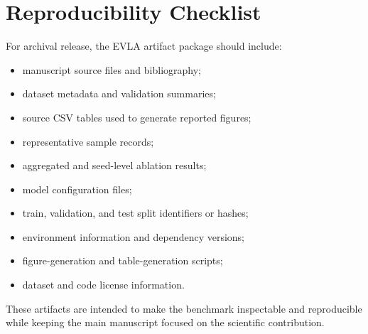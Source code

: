 \documentclass[preprint,12pt]{elsarticle}
\begin{document}
\section{Reproducibility Checklist}
\label{supp:checklist}

For archival release, the EVLA artifact package should include:
\begin{itemize}[leftmargin=*]
    \item manuscript source files and bibliography;
    \item dataset metadata and validation summaries;
    \item source CSV tables used to generate reported figures;
    \item representative sample records;
    \item aggregated and seed-level ablation results;
    \item model configuration files;
    \item train, validation, and test split identifiers or hashes;
    \item environment information and dependency versions;
    \item figure-generation and table-generation scripts;
    \item dataset and code license information.
\end{itemize}

These artifacts are intended to make the benchmark inspectable and reproducible while keeping the main manuscript focused on the scientific contribution.
\end{document}
